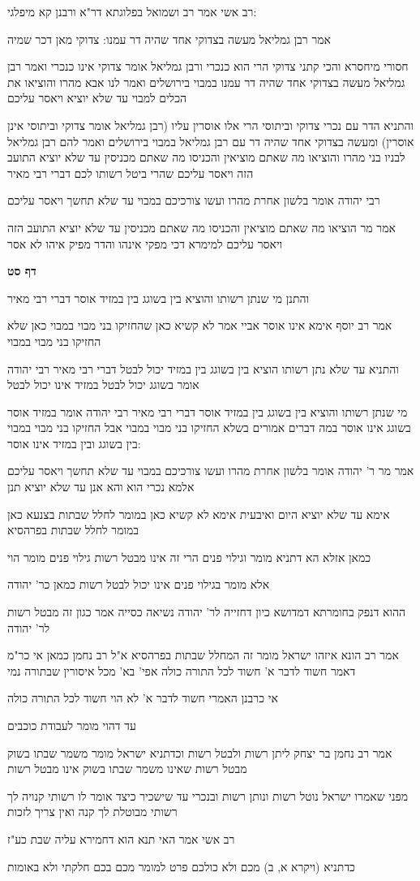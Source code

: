 \documentclass[12pt, openany]{book}
\newcommand{\sethebfont}{
\fontsize{10.5pt}{21.0pt} \selectfont
}
\newcommand{\textblock}[1]{
{\sethebfont #1\\}	
}
\newcommand{\sectname}{}
\newcommand{\newsection}[1]{
	\addcontentsline{toc}{section}{#1}
	\renewcommand{\sectname}{#1}	
	\vspace{-\baselineskip}
	\begin{center}
		\textbf{%
\fontsize{16pt}{16pt}\selectfont
			#1}
	\end{center}
	\vspace{-\baselineskip}
	\nopagebreak
}
\begin{document}
\textblock{רב אשי אמר רב ושמואל בפלוגתא דר"א ורבנן קא מיפלגי:}
\textblock{אמר רבן גמליאל מעשה בצדוקי אחד שהיה דר עמנו: צדוקי מאן דכר שמיה}
\textblock{חסורי מיחסרא והכי קתני צדוקי הרי הוא כנכרי ורבן גמליאל אומר צדוקי אינו כנכרי ואמר רבן גמליאל מעשה בצדוקי אחד שהיה דר עמנו במבוי בירושלים ואמר לנו אבא מהרו והוציאו את הכלים למבוי עד שלא יוציא ויאסר עליכם}
\textblock{והתניא הדר עם נכרי צדוקי וביתוסי הרי אלו אוסרין עליו (רבן גמליאל אומר צדוקי וביתוסי אינן אוסרין) ומעשה בצדוקי אחד שהיה דר עם רבן גמליאל במבוי בירושלים ואמר להם רבן גמליאל לבניו בני מהרו והוציאו מה שאתם מוציאין והכניסו מה שאתם מכניסין עד שלא יוציא התועב הזה ויאסר עליכם שהרי ביטל רשותו לכם דברי רבי מאיר}
\textblock{רבי יהודה אומר בלשון אחרת מהרו ועשו צורכיכם במבוי עד שלא תחשך ויאסר עליכם}
\textblock{אמר מר הוציאו מה שאתם מוציאין והכניסו מה שאתם מכניסין עד שלא יוציא התועב הזה ויאסר עליכם למימרא דכי מפקי אינהו והדר מפיק איהו לא אסר}
\newsection{דף סט}
\textblock{והתנן מי שנתן רשותו והוציא בין בשוגג בין במזיד אוסר דברי רבי מאיר}
\textblock{אמר רב יוסף אימא אינו אוסר אביי אמר לא קשיא כאן שהחזיקו בני מבוי במבוי כאן שלא החזיקו בני מבוי במבוי}
\textblock{והתניא עד שלא נתן רשותו הוציא בין בשוגג בין במזיד יכול לבטל דברי רבי מאיר רבי יהודה אומר בשוגג יכול לבטל במזיד אינו יכול לבטל}
\textblock{מי שנתן רשותו והוציא בין בשוגג בין במזיד אוסר דברי רבי מאיר רבי יהודה אומר במזיד אוסר בשוגג אינו אוסר במה דברים אמורים בשלא החזיקו בני מבוי במבוי אבל החזיקו בני מבוי במבוי בין בשוגג ובין במזיד אינו אוסר:}
\textblock{אמר מר ר' יהודה אומר בלשון אחרת מהרו ועשו צורכיכם במבוי עד שלא תחשך ויאסר עליכם אלמא נכרי הוא והא אנן עד שלא יוציא תנן}
\textblock{אימא עד שלא יוציא היום ואיבעית אימא לא קשיא כאן במומר לחלל שבתות בצנעא כאן במומר לחלל שבתות בפרהסיא}
\textblock{כמאן אזלא הא דתניא מומר וגילוי פנים הרי זה אינו מבטל רשות גילוי פנים מומר הוי}
\textblock{אלא מומר בגילוי פנים אינו יכול לבטל רשות כמאן כר' יהודה}
\textblock{ההוא דנפק בחומרתא דמדושא כיון דחזייה לר' יהודה נשיאה כסייה אמר כגון זה מבטל רשות לר' יהודה}
\textblock{אמר רב הונא איזהו ישראל מומר זה המחלל שבתות בפרהסיא א"ל רב נחמן כמאן אי כר"מ דאמר חשוד לדבר א' חשוד לכל התורה כולה אפי' בא' מכל איסורין שבתורה נמי}
\textblock{אי כרבנן האמרי חשוד לדבר א' לא הוי חשוד לכל התורה כולה}
\textblock{עד דהוי מומר לעבודת כוכבים}
\textblock{אמר רב נחמן בר יצחק ליתן רשות ולבטל רשות וכדתניא ישראל מומר משמר שבתו בשוק מבטל רשות שאינו משמר שבתו בשוק אינו מבטל רשות}
\textblock{מפני שאמרו ישראל נוטל רשות ונותן רשות ובנכרי עד שישכיר כיצד אומר לו רשותי קנויה לך רשותי מבוטלת לך קנה ואין צריך לזכות}
\textblock{רב אשי אמר האי תנא הוא דחמירא עליה שבת כע"ז}
\textblock{כדתניא (ויקרא א, ב) מכם ולא כולכם פרט למומר מכם בכם חלקתי ולא באומות}
\end{document}

